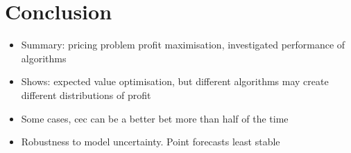 \documentclass[main.tex]{subfiles}
\begin{document}
\listoftodos

\section{Conclusion}
\begin{itemize}
\item Summary: pricing problem profit maximisation, investigated
  performance of algorithms
\item Shows: expected value optimisation, but different algorithms may
  create different distributions of profit
\item Some cases, cec can be a better bet more than half of the time
\item Robustness to model uncertainty. Point forecasts least stable
\end{itemize}

\biblio
\end{document}
